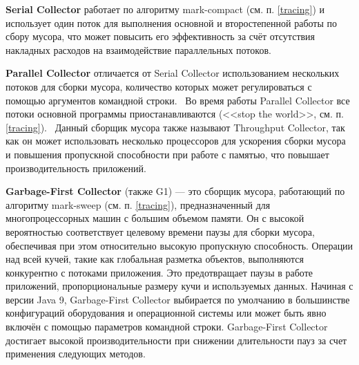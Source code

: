 \textbf{Serial Collector} работает по алгоритму mark-compact (см. п. \ref{tracing}) и использует один поток для выполнения основной и второстепенной работы по сбору мусора, что может повысить его эффективность за счёт отсутствия накладных расходов на взаимодействие параллельных потоков.~\cite{java_21_available_collectors}

\textbf{Parallel Collector} отличается от Serial Collector использованием нескольких потоков для сборки мусора, количество которых может регулироваться с помощью аргументов командной строки.~\cite{java_21_available_collectors} Во время работы Parallel Collector все потоки основной программы приостанавливаются (<<stop the world>>, см. п. \ref{tracing}).~\cite{java_jrockit_memory} Данный сборщик мусора также называют Throughput Collector, так как он может использовать несколько процессоров для ускорения сборки мусора и повышения пропускной способности при работе с памятью, что повышает производительность приложений.~\cite{java_gc_basics}

\textbf{Garbage-First Collector} (также G1) --- это сборщик мусора, работающий по алгоритму mark-sweep (см. п. \ref{tracing}), предназначенный для многопроцессорных машин с большим объемом памяти. Он с высокой вероятностью соответствует целевому времени паузы для сборки мусора, обеспечивая при этом относительно высокую пропускную способность. Операции над всей кучей, такие как глобальная разметка объектов, выполняются конкурентно с потоками приложения. Это предотвращает паузы в работе приложений, пропорциональные размеру кучи и используемых данных. Начиная с версии Java 9, Garbage-First Collector выбирается по умолчанию в большинстве конфигураций оборудования и операционной системы или может быть явно включён с помощью параметров командной строки. Garbage-First Collector достигает высокой производительности при снижении длительности пауз за счет применения следующих методов.~\cite{java_g1}

